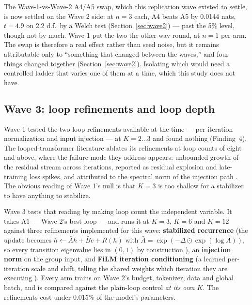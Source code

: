 \documentclass[11pt,a4paper]{article}
\begin{document}
The Wave-1-vs-Wave-2 A4/A5 swap, which this replication wave existed to settle, is now settled on
the Wave 2 side: at $n=3$ each, A4 beats A5 by 0.0144 nats, $t = 4.9$ on 2.2 d.f.\ by a Welch test
(Section~\ref{sec:wave2}) --- past the 5\% level, though not by much. Wave 1 put the two the other
way round, at $n=1$ per arm. The swap is therefore a real effect rather than seed noise, but it
remains attributable only to ``something that changed between the waves,'' and four things changed
together (Section~\ref{sec:wave2}). Isolating which would need a controlled ladder that varies one
of them at a time, which this study does not have.

\subsection{Wave 3: loop refinements and loop depth}
\label{sec:wave3}

Wave 1 tested the two loop refinements available at the time --- per-iteration normalization and
input injection --- at $K{=}2\ldots3$ and found nothing (Finding~4). The looped-transformer
literature ablates its refinements at loop counts of eight and above, where the failure mode they
address appears: unbounded growth of the residual stream across iterations, reported as residual
explosion and late-training loss spikes, and attributed to the spectral norm of the injection path
\cite{parcae}. The obvious reading of Wave 1's null is that $K{=}3$ is too shallow for a stabilizer
to have anything to stabilize.

Wave 3 tests that reading by making loop count the independent variable. It takes A1 --- Wave 2's
best loop --- and runs it at $K{=}3$, $K{=}6$ and $K{=}12$ against three refinements implemented for
this wave: \textbf{stabilized recurrence} (the update becomes $h \leftarrow \bar{A} h + \bar{B} e +
R(h)$ with $\bar{A} = \exp(-\Delta \odot \exp(\log A))$, so every transition eigenvalue lies in
$(0,1)$ by construction \cite{parcae}), an \textbf{injection norm} on the group input, and
\textbf{FiLM iteration conditioning} (a learned per-iteration scale and shift, telling the shared
weights which iteration they are executing \cite{depthcond}). Every arm trains on Wave 2's budget,
tokenizer, data and global batch, and is compared against the plain-loop control \emph{at its own
$K$}. The refinements cost under 0.015\% of the model's parameters.
\end{document}
